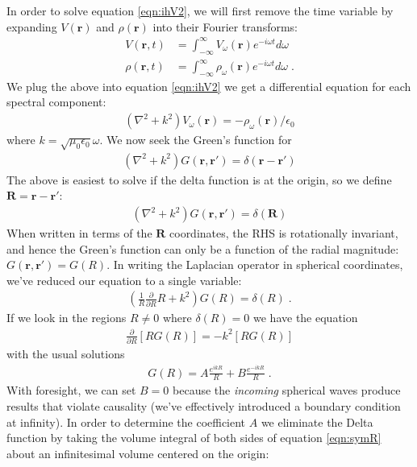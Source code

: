 \documentclass[12pt]{article}
\renewcommand{\vec}[1]{\boldsymbol{#1}}
\begin{document}
In order to solve equation \ref{eqn:ihV2}, we will first remove the time variable by expanding $V(\vec{r})$ and
$\rho(\vec{r})$ into their Fourier transforms:
\begin{align}\label{eqn:Vw}
V(\vec{r}, t) &= \int_{-\infty}^{\infty} V_{\omega}(\vec{r})e^{- i\omega t} d\omega \\
    \rho(\vec{r}, t) &= \int_{-\infty}^{\infty} \rho_{\omega}(\vec{r})e^{- i\omega t} d\omega \;.
\end{align}
We plug the above into equation \ref{eqn:ihV2} we get a differential 
equation for each spectral component:
\begin{align}
(\nabla^2 + k^2) V_\omega(\vec{r}) = -\rho_\omega (\vec{r})/\epsilon_0
\end{align}
where $k = \sqrt{\mu_0\epsilon_0}\omega$.  We now seek the Green's function for
\begin{align}
 (\nabla^2 + k^2)G(\vec{r}, \vec{r}') = \delta(\vec{r}-\vec{r}')
\end{align}
The above is easiest to solve if the delta function is at the origin, so we define $\vec{R} = \vec{r}-\vec{r}'$:
\begin{align}
 (\nabla^2 + k^2)G(\vec{r}, \vec{r}') = \delta(\vec{R})
\end{align}
When written in terms of the $\vec{R}$ coordinates, the RHS is rotationally 
invariant, and hence the Green's function can only be a function of the radial 
magnitude: 
$G(\vec{r}, \vec{r}') = G(R)$.  In writing the Laplacian operator in spherical 
coordinates, we've reduced our equation to a single variable:
\begin{align}\label{eqn:symR}
\left(\frac{1}{R}\frac{\partial}{\partial R}R + k^2\right)G(R) = \delta(R) \;.
\end{align}
If we look in the regions $R \ne 0$ where $\delta(R)=0$ we have the equation
\begin{align}
\frac{\partial}{\partial R}[RG(R)] =- k^2 [R G(R)]  
\end{align}
with the usual solutions
\begin{align}
 G(R) = A \frac{e^{ikR}}{R} + B \frac{e^{-ikR}}{R} \;.
\end{align}
With foresight, we can set $B=0$ because the \emph{incoming} spherical waves produce results
that violate causality (we've effectively introduced a boundary condition at 
infinity).  In order to determine the coefficient $A$ we eliminate the 
Delta function by taking the volume integral of both sides of equation 
\ref{eqn:symR}
about an infinitesimal volume centered on the origin:
\end{document}
